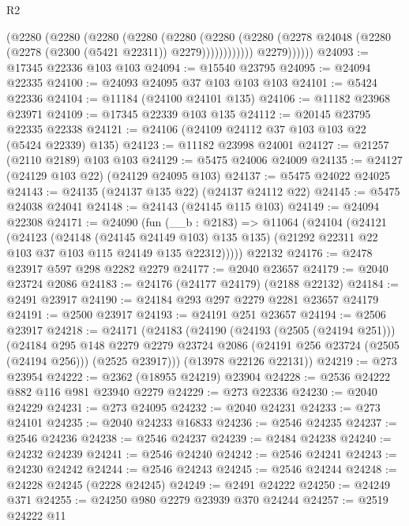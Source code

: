 \begin{lexlean}{R2}
\begin{coremodule}
                    (@2280
                      (@2280
                        (@2280
                          (@2280
                            (@2280
                              (@2280
                                (@2280
                                  (@2278
                                    @24048
                                    (@2280 (@2278 (@2300 (@5421 @22311)) @2279))))))))))))
                @2279))))))
@24093 := @17345 @22336 @103 @103
@24094 := @15540 @23795
@24095 := @24094 @22335
@24100 := @24093 @24095 @37 @103 @103 @103
@24101 := @5424 @22336
@24104 := @11184 (@24100 @24101 @135)
@24106 := @11182 @23968 @23971
@24109 := @17345 @22339 @103 @135
@24112 := @20145 @23795 @22335 @22338
@24121 := @24106 (@24109 @24112 @37 @103 @103 @22 (@5424 @22339) @135)
@24123 := @11182 @23998 @24001
@24127 := @21257 (@2110 @2189) @103 @103
@24129 := @5475 @24006 @24009
@24135 := @24127 (@24129 @103 @22) (@24129 @24095 @103)
@24137 := @5475 @24022 @24025
@24143 := @24135 (@24137 @135 @22) (@24137 @24112 @22)
@24145 := @5475 @24038 @24041
@24148 := @24143 (@24145 @115 @103)
@24149 := @24094 @22308
@24171 := @24090
    (fun (__b : @2183) =>
    @11064
      (@24104
        (@24121
          (@24123
            (@24148 (@24145 @24149 @103) @135 @135)
            (@21292 @22311 @22 @103 @37 @103 @115 @24149 @135 @22312)))))
    @22132
@24176 := @2478 @23917 @597 @298 @2282 @2279
@24177 := @2040 @23657
@24179 := @2040 @23724 @2086
@24183 := @24176 (@24177 @24179) (@2188 @22132)
@24184 := @2491 @23917
@24190 := @24184 @293 @297 @2279 @2281 @23657 @24179
@24191 := @2500 @23917
@24193 := @24191 @251 @23657
@24194 := @2506 @23917
@24218 := @24171
    (@24183
      (@24190
        (@24193 (@2505 (@24194 @251)))
        (@24184
          @295
          @148
          @2279
          @2279
          @23724
          @2086
          (@24191 @256 @23724 (@2505 (@24194 @256)))
          (@2525 @23917)))
      (@13978 @22126 @22131))
@24219 := @273 @23954
@24222 := @2362 (@18955 @24219) @23904
@24228 := @2536 @24222 @882 @116 @981 @23940 @2279
@24229 := @273 @22336
@24230 := @2040 @24229
@24231 := @273 @24095
@24232 := @2040 @24231
@24233 := @273 @24101
@24235 := @2040 @24233 @16833
@24236 := @2546 @24235
@24237 := @2546 @24236
@24238 := @2546 @24237
@24239 := @2484 @24238
@24240 := @24232 @24239
@24241 := @2546 @24240
@24242 := @2546 @24241
@24243 := @24230 @24242
@24244 := @2546 @24243
@24245 := @2546 @24244
@24248 := @24228 @24245 (@2228 @24245)
@24249 := @2491 @24222
@24250 := @24249 @371
@24255 := @24250 @980 @2279 @23939 @370 @24244
@24257 := @2519 @24222 @11

\end{coremodule}
\end{lexlean}
